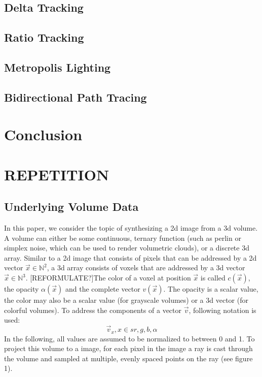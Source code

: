\subsection{Delta Tracking}
\subsection{Ratio Tracking}
\subsection{Metropolis Lighting}
\subsection{Bidirectional Path Tracing}
\section{Conclusion}
\section{REPETITION}
\subsection{Underlying Volume Data}
In this paper, we consider the topic of synthesizing a 2d image from a 3d volume.
A volume can either be some continuous, ternary function (such as perlin or simplex noise\cite{10.1145/325165.325247}, which can be used to render volumetric clouds\cite{haggstrom2018real}), or a discrete 3d array\cite{511}.
Similar to a 2d image that consists of pixels that can be addressed by a 2d vector $\vec{x} \in \mathbb{N}^2$, a 3d array consists of voxels that are addressed by a 3d vector $\vec{x} \in \mathbb{N}^3$. [REFORMULATE?]The color of a voxel at position $\vec{x}$ is called $c(\vec{x})$, the opacity $\alpha(\vec{x})$ and the complete vector $v(\vec{x})$. The opacity is a scalar value, the color may also be a scalar value (for grayscale volumes) or a 3d vector (for colorful volumes).
To address the components of a vector $\vec{v}$, following notation is used:
\begin{equation}
	\vec{v}_{x}, x \in s{r, g, b, \alpha}
\end{equation}
 In the following, all values are assumed to be normalized to between 0 and 1. To project this volume to a image, for each pixel in the image a ray is cast through the volume and sampled at multiple, evenly spaced points on the ray (see figure 1)\cite{10.1145/78964.78965}.


